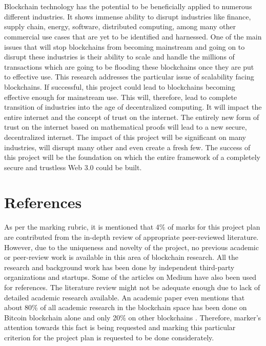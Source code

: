 \documentclass[a4paper,twoside,phd]{BYUPhys}
\begin{document}
\\
\\
Blockchain technology has the potential to be beneficially applied to numerous different industries. It shows immense ability to disrupt industries like finance, supply chain, energy, software, distributed computing, among many other commercial use cases that are yet to be identified and harnessed. One of the main issues that will stop blockchains from becoming mainstream and going on to disrupt these industries is their ability to scale and handle the millions of transactions which are going to be flooding these blockchains once they are put to effective use. This research addresses the particular issue of scalability facing blockchains. If successful, this project could lead to blockchains becoming effective enough for mainstream use. This will, therefore, lead to complete transition of industries into the age of decentralized computing. It will impact the entire internet and the concept of trust on the internet. The entirely new form of trust on the internet based on mathematical proofs will lead to a new secure, decentralized internet. The impact of this project will be significant on many industries, will disrupt many other and even create a fresh few. The success of this project will be the foundation on which the entire framework of a completely secure and trustless Web 3.0 could be built.
\section{References}
As per the marking rubric, it is mentioned that 4\% of marks for this project plan are contributed from the in-depth review of appropriate peer-reviewed literature. However, due to the uniqueness and novelty of the project, no previous academic or peer-review work is available in this area of blockchain research. All the research and background work has been done by independent third-party organizations and startups. Some of the articles on Medium have also been used for references. The literature review might not be adequate enough due to lack of detailed academic research available. An academic paper even mentions that about 80\% of all academic research in the blockchain space has been done on Bitcoin blockchain alone and only 20\% on other blockchains \cite{Yli-Huumo2016WhereReview}. Therefore, marker’s attention towards this fact is being requested and marking this particular criterion for the project plan is requested to be done considerately.
\end{document}
